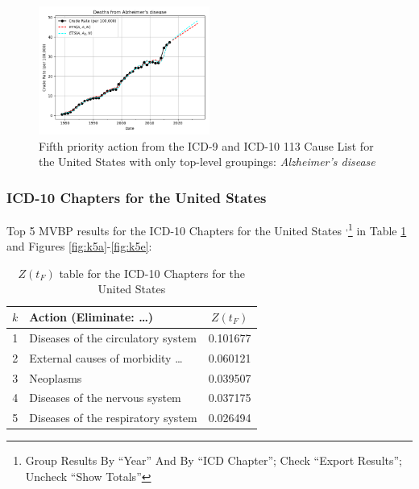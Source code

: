 \documentclass[10pt, a4paper, twocolumn]{IEEEconf}
\begin{document}
\begin{figure}[H]
  \centering
  \includegraphics[width=0.5\textwidth]{results/US_ICD_113_SELECTED_CAUSES_ROOTS/Alzheimer_s_disease_ets.png}
  \caption{Fifth priority action from the ICD-9 and ICD-10 113 Cause List for the United States with only top-level groupings: \textit{Alzheimer's disease}}\label{fig:k4e}
\end{figure}

\clearpage

\subsubsection{ICD-10 Chapters for the United States}

Top 5 MVBP results for the ICD-10 Chapters for the United States \citep{centers2017underlying}\textsuperscript{,}\footnote{Group Results By \enquote{Year} And By \enquote{ICD Chapter}; Check \enquote{Export Results}; Uncheck \enquote{Show Totals}} in Table \ref{table:ztable5} and Figures \ref{fig:k5a}-\ref{fig:k5e}:

\begin{table}[H]
  \centering
  \begin{tabular}{clc}
    \toprule
      $k$ & Action (Eliminate: \ldots) & $Z(t_F)$ \\
    \midrule
      1 &         Diseases of the circulatory system & 0.101677 \\
      2 &        External causes of morbidity \ldots & 0.060121 \\
      3 &                                  Neoplasms & 0.039507 \\
      4 &             Diseases of the nervous system & 0.037175 \\
      5 &         Diseases of the respiratory system & 0.026494 \\
  \end{tabular}
  \caption{$Z(t_F)$ table for the ICD-10 Chapters for the United States}
  \label{table:ztable5}
\end{table}
\end{document}
